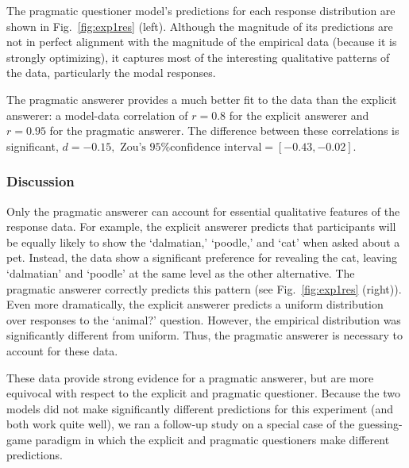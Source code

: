 \documentclass[12pt, floatsintext, man]{apa6}
\begin{document}
%
The pragmatic questioner model's predictions for each response distribution are shown in Fig.~\ref{fig:exp1res} (left). Although the magnitude of its predictions are not in perfect alignment with the magnitude of the empirical data (because it is strongly optimizing), it captures most of the interesting qualitative patterns of the data, particularly the modal responses. 

The pragmatic answerer provides a much better fit to the data than the explicit answerer: a model-data correlation of $r = 0.8$ for the explicit answerer and $r = 0.95$ for the pragmatic answerer. The difference between these correlations is significant, $d = -0.15, \textrm{ Zou's 95\% confidence interval} = [-0.43, -0.02]$.
%

\subsubsection{Discussion} Only the pragmatic answerer can account for essential qualitative features of the response data. For example, the explicit answerer predicts that participants will be equally likely to show the `dalmatian,' `poodle,' and `cat' when asked about a pet. Instead, the data show a significant preference for revealing the cat, leaving `dalmatian' and `poodle' at the same level as the other alternative. The pragmatic answerer correctly predicts this pattern  (see Fig.~\ref{fig:exp1res} (right)). Even more dramatically, the explicit answerer predicts a uniform distribution over responses to the `animal?' question. %
However, the empirical distribution was significantly different from uniform. Thus, the pragmatic answerer is necessary to account for these data.

These data provide strong evidence for a pragmatic answerer, but are more equivocal with respect to the explicit and pragmatic questioner. Because the two models did not make significantly different predictions for this experiment (and both work quite well), we ran a follow-up study on a special case of the guessing-game paradigm in which the explicit and pragmatic questioners make different predictions.
\end{document}
